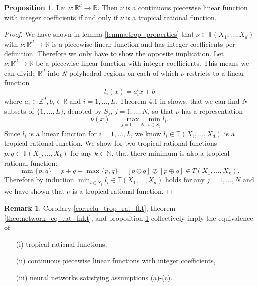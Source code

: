 \documentclass{article}
\theoremstyle{definition}
\newtheorem{proposition}[theorem]{Proposition}
\newtheorem{remark}[theorem]{Remark}
\begin{document}
\begin{proposition}\hspace{1sp}\cite{zhang2018tropical}
\label{prop:plin_trop_fnkt}
Let $\nu : \mathbb{R}^{d} \to \mathbb{R}$. Then $\nu$ is a continuous piecewise linear function with integer coefficients if and only if $\nu$ is a tropical rational function.
\end{proposition}
\begin{proof}
We have shown in lemma \ref{lemma:trop_properties} that $\nu \in \mathbb{T}(X_1, \dots, X_d)$ with $\nu: \mathbb{R}^{d} \to \mathbb{R}$ is a piecewise linear function and has integer coefficients per definition. Therefore we only have to show the opposite implication. Let $\nu : \mathbb{R}^{d} \to \mathbb{R}$ be a piecewise linear function with integer coefficients. This means we can divide $\mathbb{R}^{d}$ into $N$ polyhedral regions on each of which $\nu$ restricts to a linear function
$$l_{i}(x) = a_{i}^{t}x + b$$
where $a_{i} \in \mathbb{Z}^{d}, b_{i} \in \mathbb{R}$ and $i=1, \dots, L$. Theorem 4.1 in \cite{tarela1999region} shows, that we can find $N$ subsets of $\{ 1, \dots , L\}$, denoted by $S_{j}$, $j=1, \dots , N$, so that $\nu$ has a representation
$$\nu (x) = \max_{j=1,\dots,N} \min_{i \in S_j} l_i.$$
Since $l_{i}$ is a linear function for $i=1, \dots, L$, we know $l_i \in \mathbb{T}(X_1, \dots, X_d)$ is a tropical rational function. We show for two tropical rational functions $p,q \in \mathbb{T}(X_1, \dots , X_k)$ for any $k \in \mathbb{N}$, that there minimum is also a tropical rational function:
$$\min\{p,q\} = p + q - \max\{p,q\} = [p \odot q] \oslash [p \oplus q] \in T(X_1, \dots , X_k).$$
Therefore by induction $\min_{i \in S_j} l_i \in \mathbb{T}(X_1, \dots , X_d)$ holds for any $j=1, \dots , N$ and we have shown that $\nu$ is a tropical rational function.
\end{proof}

\begin{remark}\hspace{1sp}\cite{zhang2018tropical}
\label{rem:key_rem}
Corollary \ref{cor:relu_trop_rat_fkt}, theorem \ref{theo:network_eq_rat_fnkt}, and proposition \ref{prop:plin_trop_fnkt} collectively imply the equivalence of
\begin{itemize}
\item[(i)]
tropical rational functions,
\item[(ii)]
continuous piecewise linear functions with integer coefficients,
\item[(iii)]
neural networks satisfying assumptions (a)-(c).
\end{itemize}
\end{remark}
\end{document}
